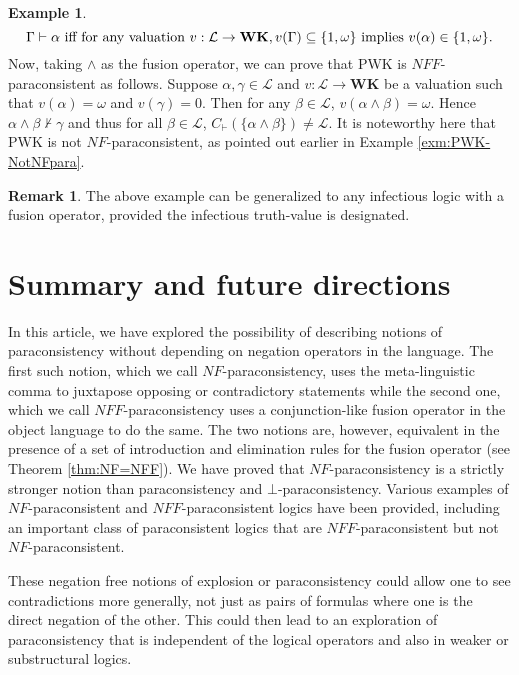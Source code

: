 \documentclass[submission]{eptcs}
\newcommand{\lang}{\mathcal{L}}
\theoremstyle{definition}
\newtheorem{rem}[thm]{Remark}
\newtheorem{exa}[thm]{Example}
\begin{document}
\begin{exa}
\[
\Gamma\vdash\alpha\hbox{ iff for any valuation } v:\lang\to\mathbf{WK}, v(\Gamma)\subseteq\{1,\omega\}\hbox{ implies }v(\alpha)\in\{1,\omega\}.
\]
Now, taking $\land$ as the fusion operator, we can prove that PWK is $NFF$-paraconsistent as follows. Suppose $\alpha,\gamma\in\lang$ and $v:\lang\to\mathbf{WK}$ be a valuation such that $v(\alpha)=\omega$ and $v(\gamma)=0$. Then for any $\beta\in\lang$, $v(\alpha\land\beta)=\omega$. Hence $\alpha\land\beta\not\vdash\gamma$ and thus for all $\beta\in\lang$, $C_\vdash(\{\alpha\land\beta\})\neq\lang$. It is noteworthy here that PWK is not $NF$-paraconsistent, as pointed out earlier in Example \ref{exm:PWK-NotNFpara}.
\end{exa}

\begin{rem}
The above example can be generalized to any infectious logic with a fusion operator, provided the infectious truth-value is designated.
\end{rem}

\section{Summary and future directions}

In this article, we have explored the possibility of describing notions of paraconsistency without depending on negation operators in the language. The first such notion, which we call $NF$-paraconsistency, uses the meta-linguistic comma to juxtapose opposing or contradictory statements while the second one, which we call $NFF$-paraconsistency uses a conjunction-like fusion operator in the object language to do the same. The two notions are, however, equivalent in the presence of a set of introduction and elimination rules for the fusion operator (see Theorem \ref{thm:NF=NFF}). We have proved that $NF$-paraconsistency is a strictly stronger notion than paraconsistency and $\bot$-paraconsistency. Various examples of $NF$-paraconsistent and $NFF$-paraconsistent logics have been provided, including an important class of paraconsistent logics that are $NFF$-paraconsistent but not $NF$-paraconsistent.

These negation free notions of explosion or paraconsistency could allow one to see contradictions more generally, not just as pairs of formulas where one is the direct negation of the other. This could then lead to an exploration of paraconsistency that is independent of the logical operators and also in weaker or substructural logics.
\end{document}
